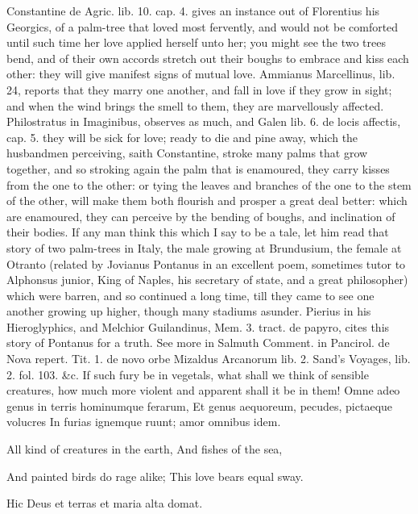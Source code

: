 {Constantine de Agric. lib. 10. cap. 4. gives an instance out of
Florentius his Georgics, of a palm-tree that loved most fervently,
 and would not be comforted until such time her love applied
herself unto her; you might see the two trees bend, and of their own
accords stretch out their boughs to embrace and kiss each other: they
will give manifest signs of mutual love. Ammianus Marcellinus, lib. 24,
reports that they marry one another, and fall in love if they grow in
sight; and when the wind brings the smell to them, they are
marvellously affected. Philostratus in Imaginibus, observes as much,
and Galen lib. 6. de locis affectis, cap. 5. they will be sick for
love; ready to die and pine away, which the husbandmen perceiving,
saith Constantine, stroke many palms that grow together, and so
stroking again the palm that is enamoured, they carry kisses from the
one to the other: or tying the leaves and branches of the one to the
stem of the other, will make them both flourish and prosper a great
deal better: which are enamoured, they can perceive by the
bending of boughs, and inclination of their bodies. If any man think
this which I say to be a tale, let him read that story of two
palm-trees in Italy, the male growing at Brundusium, the female at
Otranto (related by Jovianus Pontanus in an excellent poem, sometimes
tutor to Alphonsus junior, King of Naples, his secretary of state, and
a great philosopher) which were barren, and so continued a long time,
till they came to see one another growing up higher, though many
stadiums asunder. Pierius in his Hieroglyphics, and Melchior
Guilandinus, Mem. 3. tract. de papyro, cites this story of Pontanus for
a truth. See more in Salmuth Comment. in Pancirol. de Nova repert. Tit.
1. de novo orbe Mizaldus Arcanorum lib. 2. Sand's Voyages, lib. 2. fol.
103. \&c.
If such fury be in vegetals, what shall we think of sensible creatures,
how much more violent and apparent shall it be in them!
Omne adeo genus in terris hominumque ferarum,
Et genus aequoreum, pecudes, pictaeque volucres
In furias ignemque ruunt; amor omnibus idem.


All kind of creatures in the earth,
And fishes of the sea,

And painted birds do rage alike;
This love bears equal sway.


Hic Deus et terras et maria alta domat.

}
